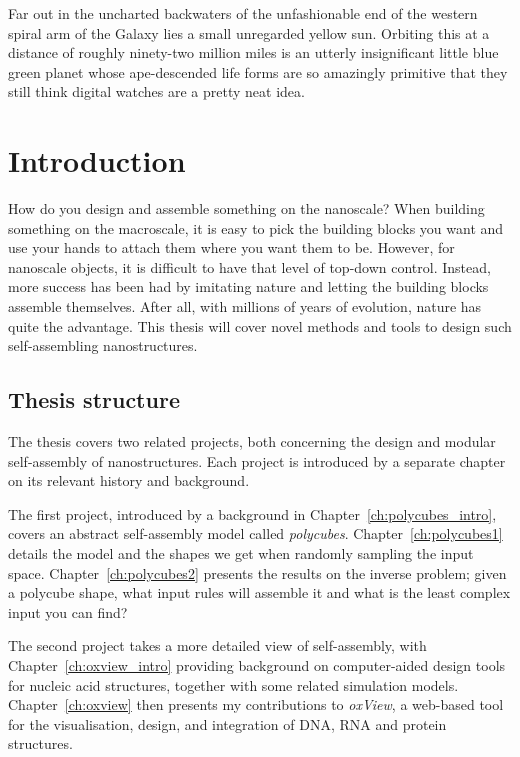 \begin{savequote}[8cm]
Far out in the uncharted backwaters of the unfashionable end of the western spiral arm of the Galaxy lies a small unregarded yellow sun. Orbiting this at a distance of roughly ninety-two million miles is an utterly insignificant little blue green planet whose ape-descended life forms are so amazingly primitive that they still think digital watches are a pretty neat idea.
\end{savequote}

\chapter{Introduction}\label{ch:1-intro}

\minitoc

How do you design and assemble something on the nanoscale? When building something on the macroscale, it is easy to pick the building blocks you want and use your hands to attach them where you want them to be. However, for nanoscale objects, it is difficult to have that level of top-down control. Instead, more success has been had by imitating nature and letting the building blocks assemble themselves. After all, with millions of years of evolution, nature has quite the advantage. This thesis will cover novel methods and tools to design such self-assembling nanostructures.

\section{Thesis structure}
The thesis covers two related projects, both concerning the design and modular self-assembly of nanostructures. Each project is introduced by a separate chapter on its relevant history and background.

The first project, introduced by a background in Chapter~\ref{ch:polycubes_intro}, covers an abstract self-assembly model called \emph{polycubes}. Chapter~\ref{ch:polycubes1} details the model and the shapes we get when randomly sampling the input space. Chapter~\ref{ch:polycubes2} presents the results on the inverse problem; given a polycube shape, what input rules will assemble it and what is the least complex input you can find?

The second project takes a more detailed view of self-assembly, with Chapter~\ref{ch:oxview_intro} providing background on computer-aided design tools for nucleic acid structures, together with some related simulation models. Chapter~\ref{ch:oxview} then presents my contributions to \emph{oxView}, a web-based tool for the visualisation, design, and integration of DNA, RNA and protein structures.


